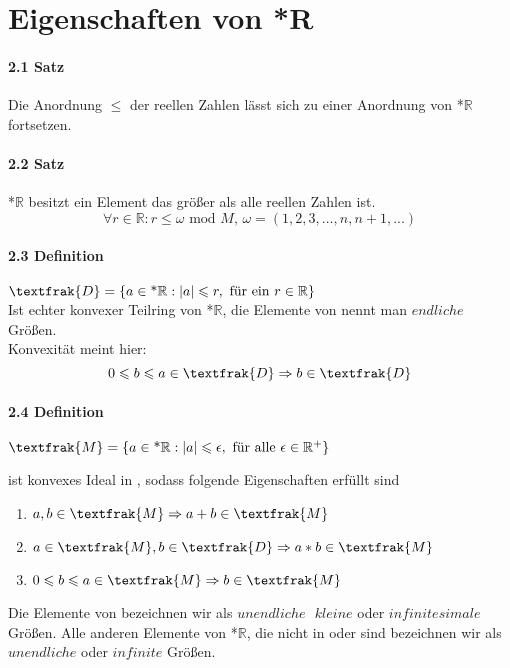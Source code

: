 \documentclass[a4paper]{article}
\begin{document}
\section{Eigenschaften von *R}

\paragraph{2.1 Satz} Die Anordnung $\leqslant$ der reellen Zahlen lässt 
sich zu einer Anordnung von *$\mathbb{R}$ fortsetzen.

\paragraph{2.2 Satz} *$\mathbb{R}$ besitzt ein Element das größer als alle reellen Zahlen ist. 
$$ \forall r \in \mathbb{R} : r \leqslant \omega \text{ mod } M \text{, } \omega = (1,2,3,...,n,n+1,...) $$

\paragraph{2.3 Definition} $ \textfrak{D} = \{a \in \text{*}\mathbb{R}: |a| \leqslant r, \text{ für ein } r \in \mathbb{R}\} $ \\
Ist echter konvexer Teilring von *$\mathbb{R}$, die Elemente von  nennt man $ endliche $ Größen. \\
Konvexität meint hier:
$$ 0 \leqslant b \leqslant a \in \textfrak{D} \Rightarrow b \in \textfrak{D} $$

\paragraph{2.4 Definition} $ \textfrak{M} = \{a \in \text{*}\mathbb{R}: |a| \leqslant \epsilon, \text{ für alle } \epsilon \in \mathbb{R}^+ \} $

\bigskip
{} ist konvexes Ideal in , sodass folgende Eigenschaften erfüllt sind 
\begin{enumerate}
      \item $a,b \in \textfrak{M} \Rightarrow a + b \in \textfrak{M} $ 
      \item $a \in \textfrak{M}, b \in \textfrak{D} \Rightarrow a * b \in \textfrak{M} $ 
      \item $0 \leqslant b \leqslant a \in \textfrak{M} \Rightarrow b \in \textfrak{M} $ 
\end{enumerate}
Die Elemente von  bezeichnen wir als $ unendliche \text{ } kleine $ oder $ infinitesimale $ Größen. 
Alle anderen Elemente von *$\mathbb{R}$, die nicht in  oder  sind bezeichnen wir als $ unendliche $ oder $ infinite $ Größen.
\end{document}
